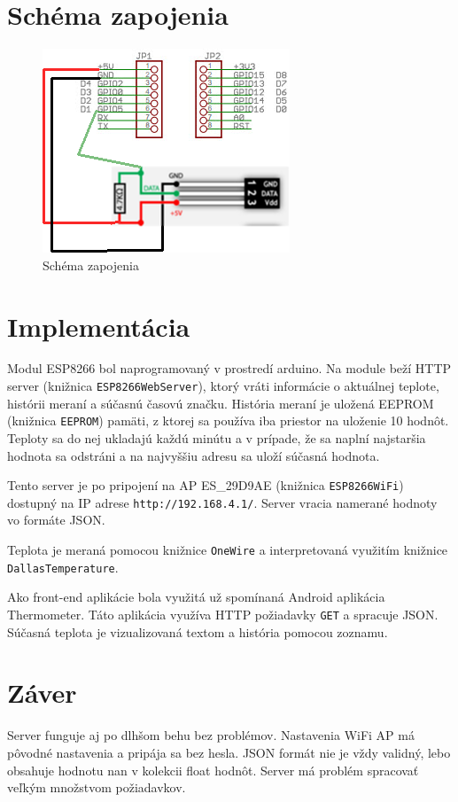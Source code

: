 \documentclass[a4paper, 11pt]{article}
\begin{document}
\section{Schéma zapojenia}
\begin{figure}[H]
	\centering
	\includegraphics[scale=0.5]{img/scheme.png}
	\caption{Schéma zapojenia}
\end{figure}

\section{Implementácia}
Modul ESP8266 bol naprogramovaný v prostredí arduino. Na module beží HTTP server (knižnica \texttt{ESP8266WebServer}), ktorý vráti informácie o aktuálnej teplote, histórii meraní a súčasnú časovú značku. História meraní je uložená EEPROM (knižnica \texttt{EEPROM}) pamäti, z ktorej sa používa iba priestor na uloženie 10 hodnôt. Teploty sa do nej ukladajú každú minútu a v prípade, že sa naplní najstaršia hodnota sa odstráni a na najvyššiu adresu sa uloží súčasná hodnota. 

Tento server je po pripojení na AP ES\_29D9AE (knižnica \texttt{ESP8266WiFi}) dostupný na IP adrese \texttt{http://192.168.4.1/}. Server vracia namerané hodnoty vo formáte JSON.

Teplota je meraná pomocou knižnice \texttt{OneWire} a interpretovaná využitím knižnice \texttt{DallasTemperature}.

Ako front-end aplikácie bola využitá už spomínaná Android aplikácia Thermometer. Táto aplikácia využíva HTTP požiadavky \texttt{GET} a spracuje JSON. Súčasná teplota je vizualizovaná textom a história pomocou zoznamu. 

\section{Záver}
Server funguje aj po dlhšom behu bez problémov. Nastavenia WiFi AP má pôvodné nastavenia a pripája sa bez hesla. JSON formát nie je vždy validný, lebo obsahuje hodnotu nan v kolekcii float hodnôt. Server má problém spracovať veľkým množstvom požiadavkov.  
\end{document}
